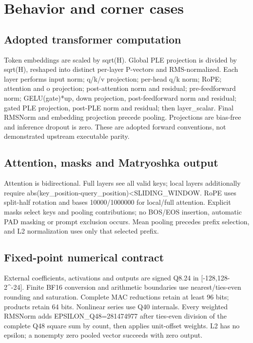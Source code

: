 \documentclass[11pt,a4paper]{article}
\begin{document}
\section{Behavior and corner cases}

\subsection{Adopted transformer computation}

Token embeddings are scaled by sqrt(\allowbreak{}H)\allowbreak{}. Global PLE projection is divided by sqrt(\allowbreak{}H)\allowbreak{},\allowbreak{} reshaped into distinct per-layer P-vectors and RMS-normalized. Each layer performs input norm; q/\allowbreak{}k/\allowbreak{}v projection; per-head q/\allowbreak{}k norm; RoPE; attention and o projection; post-attention norm and residual; pre-feedforward norm; GELU(\allowbreak{}gate)\allowbreak{}*\allowbreak{}up,\allowbreak{} down projection,\allowbreak{} post-feedforward norm and residual; gated PLE projection,\allowbreak{} post-PLE norm and residual; then layer\_\allowbreak{}scalar. Final RMSNorm and embedding projection precede pooling. Projections are bias-free and inference dropout is zero. These are adopted forward conventions,\allowbreak{} not demonstrated upstream executable parity.

\subsection{Attention,\allowbreak{} masks and Matryoshka output}

Attention is bidirectional. Full layers see all valid keys; local layers additionally require abs(\allowbreak{}key\_\allowbreak{}position-query\_\allowbreak{}position)\allowbreak{}<SLIDING\_\allowbreak{}WINDOW. RoPE uses split-half rotation and bases 10000/\allowbreak{}1000000 for local/\allowbreak{}full attention. Explicit masks select keys and pooling contributions; no BOS/\allowbreak{}EOS insertion,\allowbreak{} automatic PAD masking or prompt exclusion occurs. Mean pooling precedes prefix selection,\allowbreak{} and L2 normalization uses only that selected prefix.

\subsection{Fixed-point numerical contract}

External coefficients,\allowbreak{} activations and outputs are signed Q8.24 in [\allowbreak{}-128,\allowbreak{}128-2\textasciicircum{}-24]\allowbreak{}. Finite BF16 conversion and arithmetic boundaries use nearest/\allowbreak{}ties-even rounding and saturation. Complete MAC reductions retain at least 96 bits; products retain 64 bits. Nonlinear series use Q40 internals. Every weighted RMSNorm adds EPSILON\_\allowbreak{}Q48=\allowbreak{}281474977 after ties-even division of the complete Q48 square sum by count,\allowbreak{} then applies unit-offset weights. L2 has no epsilon; a nonempty zero pooled vector succeeds with zero output.
\end{document}
